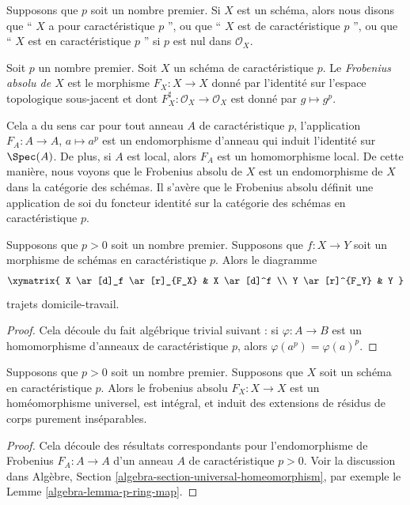 \noindent
Supposons que $p$ soit un nombre premier. Si $X$ est un schéma, alors nous disons
que `` $X$ a pour caractéristique $p$ '', ou que `` $X$ est de caractéristique $p$
'', ou que `` $X$ est en caractéristique $p$ '' si $p$ est nul dans $\mathcal{O}_X$.

\begin{definition}
\label{definition-absolute-frobenius}
Soit $p$ un nombre premier. Soit $X$ un schéma de caractéristique $p$.
Le {\it Frobenius absolu de $X$ } est le morphisme $F_X : X \to X$
donné par l'identité sur l'espace topologique sous-jacent et dont
$F_X^\sharp : \mathcal{O}_X \to \mathcal{O}_X$ est donné par $g \mapsto g^p$.
\end{definition}

\noindent
Cela a du sens car pour tout anneau $A$ de caractéristique $p$,
l'application $F_A : A \to A$, $a \mapsto a^p$ est un
endomorphisme d'anneau qui induit l'identité sur $\Spec(A)$. De
plus, si $A$ est local, alors $F_A$ est un homomorphisme local.
De cette manière, nous voyons que le Frobenius absolu de $X$ est
un endomorphisme de $X$ dans la catégorie des schémas. Il s'avère
que le Frobenius absolu définit une application de soi du
foncteur identité sur la catégorie des schémas en caractéristique $p$.

\begin{lemma}
\label{lemma-frobenius-endomorphism-identity}
Supposons que $p > 0$ soit un nombre premier.
Supposons que $f : X \to Y$ soit un morphisme de
schémas en caractéristique $p$. Alors le diagramme
$$
\xymatrix{
X \ar[d]_f \ar[r]_{F_X} & X \ar[d]^f \\
Y \ar[r]^{F_Y} & Y
}
$$
trajets domicile-travail.
\end{lemma}

\begin{proof}
Cela découle du fait algébrique trivial suivant : si
$\varphi : A \to B$ est un homomorphisme d'anneaux de
caractéristique $p$, alors $\varphi(a^p) = \varphi(a)^p$.
\end{proof}

\begin{lemma}
\label{lemma-frobenius}
Supposons que $p > 0$ soit un nombre premier. Supposons que $X$
soit un schéma en caractéristique $p$. Alors le frobenius absolu
$F_X : X \to X$ est un homéomorphisme universel, est intégral, et
induit des extensions de résidus de corps purement inséparables.
\end{lemma}

\begin{proof}
Cela découle des résultats correspondants pour l'endomorphisme de
Frobenius $F_A : A \to A$ d'un anneau $A$ de caractéristique $p > 0$.
Voir la discussion dans Algèbre, Section
\ref{algebra-section-universal-homeomorphism}, par exemple le Lemme \ref{algebra-lemma-p-ring-map}.
\end{proof}

